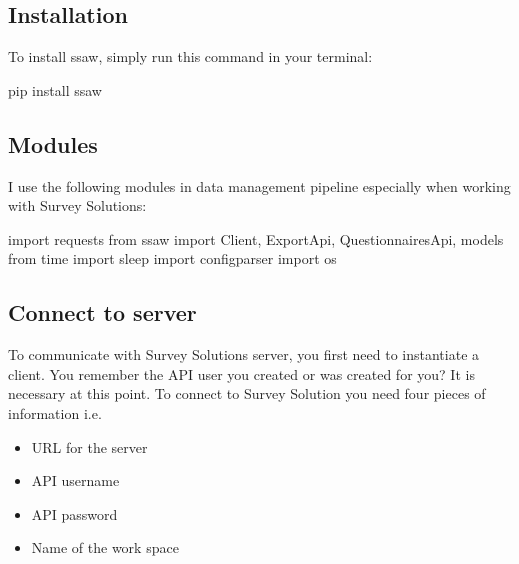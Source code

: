 \documentclass[
  letterpaper,
  DIV=11,
  numbers=noendperiod]{scrreprt}
\newenvironment{Shaded}{\begin{snugshade}}{\end{snugshade}}
\newcommand{\ImportTok}[1]{\textcolor[rgb]{0.00,0.46,0.62}{#1}}
\newcommand{\NormalTok}[1]{\textcolor[rgb]{0.00,0.23,0.31}{#1}}
\begin{document}
\subsection{Installation}\label{installation}

To install ssaw, simply run this command in your terminal:

\begin{Shaded}
\begin{Highlighting}[]

\NormalTok{pip install ssaw}
\end{Highlighting}
\end{Shaded}

\subsection{Modules}\label{modules}

I use the following modules in data management pipeline especially when
working with Survey Solutions:

\begin{Shaded}
\begin{Highlighting}[]
\ImportTok{import}\NormalTok{ requests}
\ImportTok{from}\NormalTok{ ssaw }\ImportTok{import}\NormalTok{ Client, ExportApi, QuestionnairesApi, models}
\ImportTok{from}\NormalTok{ time }\ImportTok{import}\NormalTok{ sleep}
\ImportTok{import}\NormalTok{ configparser}
\ImportTok{import}\NormalTok{ os}
\end{Highlighting}
\end{Shaded}

\subsection{Connect to server}\label{connect-to-server}

To communicate with Survey Solutions server, you first need to
instantiate a client. You remember the API user you created or was
created for you? It is necessary at this point. To connect to Survey
Solution you need four pieces of information i.e.

\begin{itemize}
\item
  URL for the server
\item
  API username
\item
  API password
\item
  Name of the work space
\end{itemize}
\end{document}

